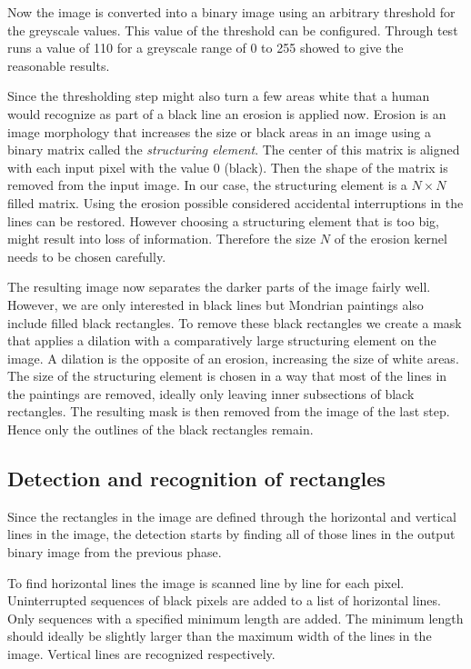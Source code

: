 Now the image is converted into a binary image using an arbitrary threshold for
the greyscale values. This value of the threshold can be configured. Through
test runs a value of 110 for a greyscale range of 0 to 255 showed to give the
reasonable results.

Since the thresholding step might also turn a few areas white that a human would
recognize as part of a black line an erosion is applied now. Erosion is an image
morphology that increases the size or black areas in an image using a binary
matrix called the \textit{structuring element}. The center of this matrix is
aligned with each input pixel with the value 0 (black). Then the shape of the
matrix is removed from the input image. In our case, the structuring element is
a $N\times N$ filled matrix. Using the erosion possible considered accidental
interruptions in the lines can be restored. However choosing a structuring
element that is too big, might result into loss of information. Therefore the
size $N$ of the erosion kernel needs to be chosen carefully.

The resulting image now separates the darker parts of the image fairly well.
However, we are only interested in black lines but Mondrian paintings also
include filled black rectangles. To remove these black rectangles we create a
mask that applies a dilation with a comparatively large structuring element on
the image. A dilation is the opposite of an erosion, increasing the size of
white areas. The size of the structuring element is chosen in a way that most of
the lines in the paintings are removed, ideally only leaving inner subsections
of black rectangles. The resulting mask is then removed from the image of the
last step. Hence only the outlines of the black rectangles remain.

\subsection{Detection and recognition of rectangles}

Since the rectangles in the image are defined through the horizontal and vertical
lines in the image, the detection starts by finding all of those lines in
the output binary image from the previous phase.

To find horizontal lines the image is scanned line by line for each pixel.
Uninterrupted sequences of black pixels are added to a list of horizontal lines.
Only sequences with a specified minimum length are added. The minimum length
should ideally be slightly larger than the maximum width of the lines in the
image. Vertical lines are recognized respectively.


